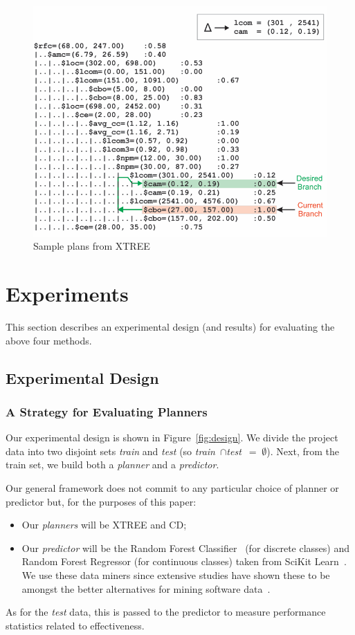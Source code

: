 \documentclass{sig-alternate}
\newcommand{\bi}{\begin{itemize}}
\newcommand{\ei}{\end{itemize}}
\newcommand{\fig}[1]{Figure~\ref{fig:#1}}
\begin{document}
{\begin{itemize}[leftmargin=3mm]
\begin{figure}[btp!]
\centering
\includegraphics[width=\linewidth]{figs/XTREE_samp.png}
\caption{Sample plans from XTREE}\label{fig:xtree_samp}
\end{figure}


\section{Experiments}

This section describes an experimental design (and results) for evaluating the above four methods. 
\subsection{Experimental Design}

\subsubsection{A Strategy for Evaluating Planners}
 
Our experimental design is shown in \fig{design}. We divide the
project data  into two disjoint sets {\em train} and {\em test}
(so \mbox{{\em train} $\cap ${\em test} $=\;\emptyset$}).
Next, from the train set, we build both a {\em planner} and
 a {\em  predictor}. 

Our general framework does not   commit to any particular choice of { planner} or { predictor} but, for the purposes of this paper:
\bi
\item Our {\em planners} will be XTREE and CD;
\item Our  {\em predictor} will be the Random Forest Classifier~\cite{Breiman2001} (for discrete classes) and Random Forest Regressor (for continuous classes) taken from  SciKit Learn~\cite{Pedregosa2012}.   We use these
data miners since extensive studies have shown these to be amongst the better alternatives for mining software data~\cite{lessmann}.
\ei
As for the {\em test} data, this is passed to the { predictor}
to measure performance statistics related to effectiveness. 


\end{itemize}}
\end{document}
